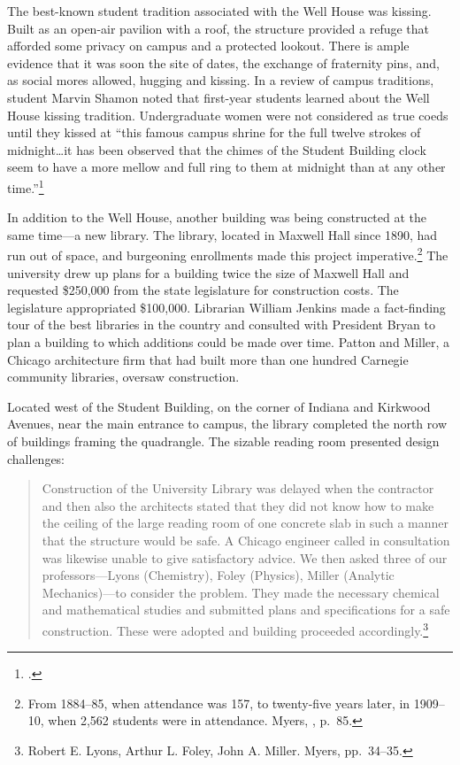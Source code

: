 \documentclass[
  american,
  letterpaper,
]{scrreprt}
\begin{document}
The best-known student tradition associated with the Well House was
kissing. Built as an open-air pavilion with a roof, the structure
provided a refuge that afforded some privacy on campus and a protected
lookout. There is ample evidence that it was soon the site of dates, the
exchange of fraternity pins, and, as social mores allowed, hugging and
kissing. In a review of campus traditions, student Marvin Shamon noted
that first-year students learned about the Well House kissing tradition.
Undergraduate women were not considered as true coeds until they kissed
at ``this famous campus shrine for the full twelve strokes of
midnight\ldots it has been observed that the chimes of the Student
Building clock seem to have a more mellow and full ring to them at
midnight than at any other time.''\footnote{.}

In addition to the Well House, another building was being constructed at
the same time---a new library. The library, located in Maxwell Hall
since 1890, had run out of space, and burgeoning enrollments made this
project imperative.\footnote{ From 1884--85, when attendance was 157, to
  twenty-five years later, in 1909--10, when 2,562 students were in
  attendance. Myers, , p.~85.} The university drew up plans for a
building twice the size of Maxwell Hall and requested \$250,000 from the
state legislature for construction costs. The legislature appropriated
\$100,000. Librarian William Jenkins made a fact-finding tour of the
best libraries in the country and consulted with President Bryan to plan
a building to which additions could be made over time. Patton and
Miller, a Chicago architecture firm that had built more than one hundred
Carnegie community libraries, oversaw construction.

Located west of the Student Building, on the corner of Indiana and
Kirkwood Avenues, near the main entrance to campus, the library
completed the north row of buildings framing the quadrangle. The sizable
reading room presented design challenges:

\begin{quote}
Construction of the University Library was delayed when the contractor
and then also the architects stated that they did not know how to make
the ceiling of the large reading room of one concrete slab in such a
manner that the structure would be safe. A Chicago engineer called in
consultation was likewise unable to give satisfactory advice. We then
asked three of our professors---Lyons (Chemistry), Foley (Physics),
Miller (Analytic Mechanics)---to consider the problem. They made the
necessary chemical and mathematical studies and submitted plans and
specifications for a safe construction. These were adopted and building
proceeded accordingly.\footnote{Robert E. Lyons, Arthur L. Foley, John
  A. Miller. Myers{}, pp.~34--35.}
\end{quote}
\end{document}
